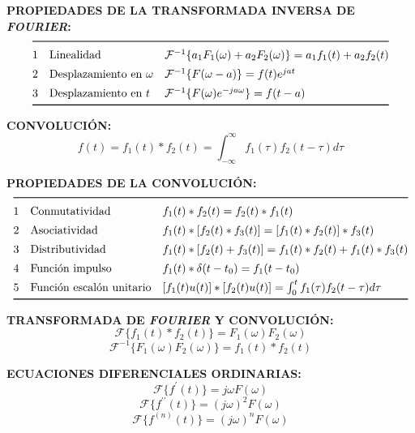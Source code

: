 \documentclass[letter,twoside,8pt]{article}
\begin{document}
\textbf{PROPIEDADES DE LA TRANSFORMADA INVERSA DE \emph{FOURIER}:}
\begin{equation*}
\def\arraystretch{1.4}
\begin{array}{@{}cll@{}}
\toprule
 1 & \text{Linealidad}
   & \mathcal{F}^{-1}\{a_1F_1(\omega)+a_2F_2(\omega)\}=a_1f_1(t)+a_2f_2(t)\\
 2 & \text{Desplazamiento en }\omega
   & \mathcal{F}^{-1}\{F(\omega-a)\}=f(t)e^{jat}\\
 3 & \text{Desplazamiento en }t
   & \mathcal{F}^{-1}\{F(\omega)e^{-ja\omega}\}=f(t-a)\\
\bottomrule
\end{array}
\end{equation*}

\textbf{CONVOLUCIÓN:}
\begin{equation*}
    f(t)=f_1(t)*f_2(t)=\int_{-\infty}^{\infty}f_1(\tau)f_2(t-\tau){d\tau}
\end{equation*}

\textbf{PROPIEDADES DE LA CONVOLUCIÓN:}
\begin{equation*}
\def\arraystretch{1.4}
\begin{array}{@{}cll@{}}
\toprule
 1 & \text{Conmutatividad}
   & f_1(t)*f_2(t)=f_2(t)*f_1(t)\\
 2 & \text{Asociatividad}
   & f_1(t)*[f_2(t)*f_3(t)]=[f_1(t)*f_2(t)]*f_3(t)\\
 3 & \text{Distributividad}
   & f_1(t)*[f_2(t)+f_3(t)]=f_1(t)*f_2(t)+f_1(t)*f_3(t)\\
 4 & \text{Función impulso}
   & f_1(t)*\delta(t-t_0)=f_1(t-t_0)\\
 5 & \text{Función escalón unitario}
   & [f_1(t)u(t)]*[f_2(t)u(t)]=\int_0^{t}f_1(\tau)f_2(t-\tau){d\tau}\\
\bottomrule
\end{array}
\end{equation*}

\textbf{TRANSFORMADA DE \emph{FOURIER} Y CONVOLUCIÓN:}
\begin{equation*}
    \mathcal{F}\{f_1(t)*f_2(t)\}=F_1(\omega)F_2(\omega)
\end{equation*}
\begin{equation*}
    \mathcal{F}^{-1}\{F_1(\omega)F_2(\omega)\}=f_1(t)*f_2(t)
\end{equation*}

\textbf{ECUACIONES DIFERENCIALES ORDINARIAS:}
\begin{equation*}
    \mathcal{F}\{f^{\prime}(t)\}=j{\omega}F(\omega)
\end{equation*}
\begin{equation*}
    \mathcal{F}\{f^{\prime\prime}(t)\}={(j\omega)}^{2}F(\omega)
\end{equation*}
\begin{equation*}
    \mathcal{F}\{f^{(n)}(t)\}={(j\omega)}^{n}F(\omega)
\end{equation*}
\end{document}

